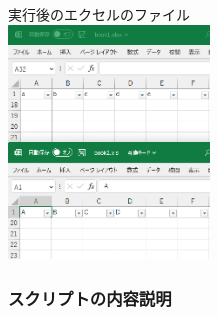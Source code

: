 \documentclass[
]{article}
\begin{document}
実行後のエクセルのファイル\\
\includegraphics[width=0.4\textwidth,height=\textheight]{img/set_autofilter_freezepanel04.png}

\hypertarget{ux30b9ux30afux30eaux30d7ux30c8ux306eux5185ux5bb9ux8aacux660e}{%
\subsubsection{スクリプトの内容説明}\label{ux30b9ux30afux30eaux30d7ux30c8ux306eux5185ux5bb9ux8aacux660e}}
\end{document}
